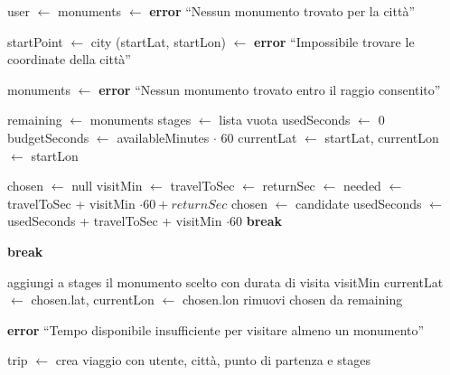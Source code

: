 \begin{algorithmic}[1]
    \State user $\gets$ 
    \State monuments $\gets$ 
        \State \textbf{error} ``Nessun monumento trovato per la città''
    \EndIf

    \State startPoint $\gets$ city
    \State (startLat, startLon) $\gets$ 
        \State \textbf{error} ``Impossibile trovare le coordinate della città''
    \EndIf

    \State monuments $\gets$ 
        \State \textbf{error} ``Nessun monumento trovato entro il raggio consentito''
    \EndIf

    \State {}
    \State remaining $\gets$ monuments
    \State stages $\gets$ lista vuota
    \State usedSeconds $\gets$ 0
    \State budgetSeconds $\gets$ availableMinutes $\cdot$ 60
    \State currentLat $\gets$ startLat, currentLon $\gets$ startLon

        \State chosen $\gets$ null
            \State visitMin $\gets$ 
            \State travelToSec $\gets$ 
            \State returnSec $\gets$ 
            \State needed $\gets$ travelToSec + visitMin $\cdot 60 + returnSec$
                \State chosen $\gets$ candidate
                \State usedSeconds $\gets$ usedSeconds + travelToSec + visitMin $\cdot 60$
                \State \textbf{break}
            \EndIf
        \EndFor

            \State \textbf{break}
        \EndIf

        \State aggiungi a stages il monumento scelto con durata di visita visitMin
        \State currentLat $\gets$ chosen.lat, currentLon $\gets$ chosen.lon
        \State rimuovi chosen da remaining
    \EndWhile

        \State \textbf{error} ``Tempo disponibile insufficiente per visitare almeno un monumento''
    \EndIf

    \State trip $\gets$ crea viaggio con utente, città, punto di partenza e stages
    \State \Return {}
\EndFunction
\end{algorithmic}



